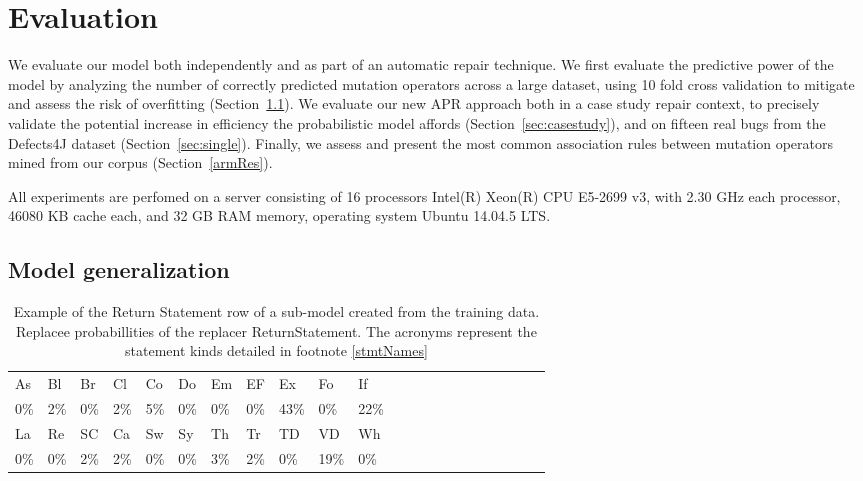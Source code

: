 \documentclass[conference]{IEEEtran}
\begin{document}
\section{Evaluation} \label{evaluation}

We evaluate our model both independently and as part of an automatic repair
technique.  We first evaluate the predictive power of the model by analyzing the
number of correctly predicted mutation operators across a large dataset, using 10 fold cross
validation to mitigate and assess the risk of overfitting
(Section~\ref{sec:generalize}). We evaluate our new APR approach both in a case study 
repair context, to precisely validate the potential increase in efficiency the
probabilistic model affords (Section~\ref{sec:casestudy}), and 
on fifteen real bugs from the Defects4J dataset
(Section~\ref{sec:single}).  Finally, we assess and present the most common 
association rules between mutation operators mined from our corpus
(Section~\ref{armRes}). 


All experiments are perfomed on a server 
consisting of 16 processors Intel(R) Xeon(R) CPU E5-2699 v3, with 2.30 GHz each
processor, 46080 KB cache each, and 32 GB RAM memory, operating system Ubuntu 
14.04.5 LTS.

\subsection{Model generalization}
\label{sec:generalize}
  

\begin{table}[ht]
\begin{tabular}{llllllllllllllllllllll}
\hline
As & Bl & Br & Cl & Co & Do & Em & EF & Ex & Fo & If \\
0\%&2\%&0\%&2\%&5\%&0\%&0\%&0\%&43\%&0\%&22\% \\
\hline 
La & Re & SC & Ca & Sw & Sy & Th & Tr & TD & VD & Wh \\
0\%&0\%&2\%&2\%&0\%&0\%&3\%&2\%&0\%&19\%&0\% \\
\hline
\end{tabular}
\\
\caption{Example of the Return Statement row of a sub-model created from 
the training data. Replacee probabillities of the replacer ReturnStatement. The acronyms represent the statement kinds detailed in footnote \ref{stmtNames}}
 \label{fig:exPredReturn} 
\end{table} 
\end{document}
